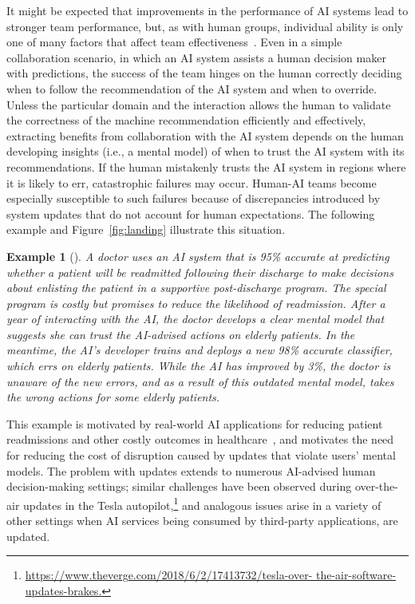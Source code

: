 \documentclass[letterpaper]{article}
\newtheorem*{example}{Example}
\begin{document}
It might be expected that improvements in the performance of AI systems lead to stronger team performance, but, as with human groups, individual ability is only one of many factors that affect team effectiveness~\cite{dechurch-jap10,grosz1996collaborative}. Even in a simple collaboration scenario, in which an AI system assists a human decision maker with predictions, the success of the team hinges on the human correctly deciding when to follow the recommendation of the AI system and when to override. Unless the particular domain and the interaction allows the human to validate the correctness of the machine recommendation efficiently and effectively, extracting benefits from collaboration with the AI system depends on the human developing insights (i.e., a mental model) of when to trust the AI system with its recommendations. If the human mistakenly trusts the AI system in regions where it is likely to err, catastrophic failures may occur. 
Human-AI teams become especially susceptible to such failures because of discrepancies introduced by system updates that do not account for human expectations. The following example and Figure~\ref{fig:landing} illustrate this situation.


\begin{example}[]
A doctor uses an AI system that is 95\% accurate at predicting whether a patient will be readmitted following their discharge to make decisions about enlisting the patient in a supportive post-discharge program. The special program is costly but promises to reduce the likelihood of readmission. After a year of interacting with the AI, the doctor develops a clear mental model that suggests she can trust the AI-advised actions on elderly patients. In the meantime, the AI's developer trains and deploys a new 98\% accurate classifier, which errs on elderly patients. 
While the AI has improved by 3\%, the doctor is unaware of the new errors, and as a result of this outdated mental model, takes the wrong actions for some elderly patients.
\end{example}

This example is motivated by real-world AI applications for reducing patient readmissions and other costly outcomes in healthcare~\cite{bayati2014data,wiens2016patient,caruana2015intelligible}, and motivates the need for reducing the cost of disruption caused by updates that violate  %
users' mental models. The problem with updates extends to numerous AI-advised human decision-making settings; similar challenges have been observed during over-the-air updates in the Tesla autopilot,\footnote{\url{https://www.theverge.com/2018/6/2/17413732/tesla-over- the-air-software-updates-brakes.}} and  analogous issues arise in a variety of other settings when AI services 
being consumed by third-party applications, are updated.
\end{document}
